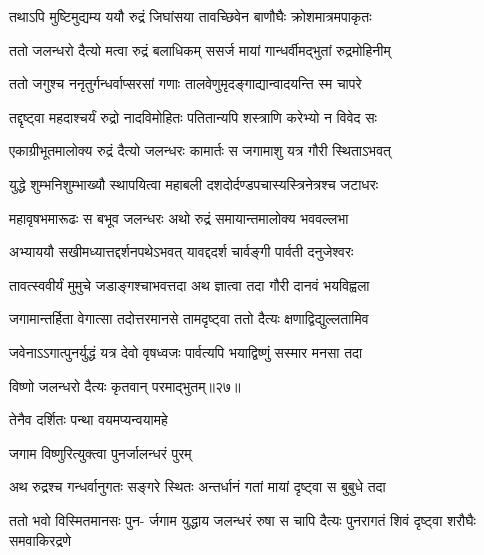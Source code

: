 \twolineshloka
{तथाऽपि मुष्टिमुद्यम्य ययौ रुद्रं जिघांसया}
{तावच्छिवेन बाणौघैः क्रोशमात्रमपाकृतः} %

\twolineshloka
{ततो जलन्धरो दैत्यो मत्वा रुद्रं बलाधिकम्}
{ससर्ज मायां गान्धर्वीमद्भुतां रुद्रमोहिनीम्} %

\twolineshloka
{ततो जगुश्च ननृतुर्गन्धर्वाप्सरसां गणाः}
{तालवेणुमृदङ्गाद्यान्वादयन्ति स्म चापरे} %

\twolineshloka
{तद्दृष्ट्वा महदाश्चर्यं रुद्रो नादविमोहितः}
{पतितान्यपि शस्त्राणि करेभ्यो न विवेद सः} %

\twolineshloka
{एकाग्रीभूतमालोक्य रुद्रं दैत्यो जलन्धरः}
{कामार्तः स जगामाशु यत्र गौरी स्थिताऽभवत्} %

\twolineshloka
{युद्धे शुम्भनिशुम्भाख्यौ स्थापयित्वा महाबली}
{दशदोर्दण्डपचास्यस्त्रिनेत्रश्च जटाधरः} %

\twolineshloka
{महावृषभमारूढः स बभूव जलन्धरः}
{अथो रुद्रं समायान्तमालोक्य भववल्लभा} %

\twolineshloka
{अभ्याययौ सखीमध्यात्तद्दर्शनपथेऽभवत्}
{यावद्ददर्श चार्वङ्गी पार्वती दनुजेश्वरः} %

\twolineshloka
{तावत्स्ववीर्यं मुमुचे जडाङ्गश्चाभवत्तदा}
{अथ ज्ञात्वा तदा गौरी दानवं भयविह्वला} %

\twolineshloka
{जगामान्तर्हिता वेगात्सा तदोत्तरमानसे}
{तामदृष्ट्वा ततो दैत्यः क्षणाद्विद्युल्लतामिव} %

\twolineshloka
{जवेनाऽऽगात्पुनर्युद्धं यत्र देवो वृषध्वजः}
{पार्वत्यपि भयाद्विष्णुं सस्मार मनसा तदा} %




विष्णो जलन्धरो दैत्यः कृतवान् परमाद्भुतम्॥२७॥



\onelineshloka
{तेनैव दर्शितः पन्था वयमप्यन्वयामहे} %




\onelineshloka
{जगाम विष्णुरित्युक्त्वा पुनर्जालन्धरं पुरम्} %

\twolineshloka
{अथ रुद्रश्च गन्धर्वानुगतः सङ्गरे स्थितः}
{अन्तर्धानं गतां मायां दृष्ट्वा स बुबुधे तदा} %

\fourlineindentedshloka
{ततो भवो विस्मितमानसः पुन-}
{र्जगाम युद्धाय जलन्धरं रुषा}
{स चापि दैत्यः पुनरागतं शिवं}
{दृष्ट्वा शरौघैः समवाकिरद्रणे} %


